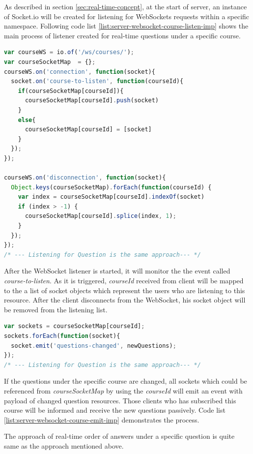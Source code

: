 As described in section \ref{sec:real-time-concept}, at the start of server, an instance of Socket.io will be created for listening for WebSockets requests within a specific namespace. Following code list \ref{list:server-websocket-course-listen-imp} shows the main process of listener created for real-time questions under a specific course.

\begin{lstlisting}[language=JavaScript, caption=Server starts listening for requests over WebSocket protocol , label={list:server-websocket-course-listen-imp}]
var courseWS = io.of('/ws/courses/');
var courseSocketMap  = {};
courseWS.on('connection', function(socket){
  socket.on('course-to-listen', function(courseId){
    if(courseSocketMap[courseId]){
      courseSocketMap[courseId].push(socket)
    }
    else{
      courseSocketMap[courseId] = [socket]
    }
  });
});

courseWS.on('disconnection', function(socket){
  Object.keys(courseSocketMap).forEach(function(courseId) {
    var index = courseSocketMap[courseId].indexOf(socket)
    if (index > -1) {
      courseSocketMap[courseId].splice(index, 1);
    }
  });
});
/* --- Listening for Question is the same approach--- */
\end{lstlisting}

After the WebSocket listener is started, it will monitor the the event called \textit{course-to-listen}. As it is triggered, \textit{courseId} received from client will be mapped to the a list of socket objects which represent the users who are listening to this resource. After the client disconnects from the WebSocket, his socket object will be removed from the listening list. 

\begin{lstlisting}[language=JavaScript, caption=Server broadcast to all sockets who has subscribed the certain resource, label={list:server-websocket-course-emit-imp}]
var sockets = courseSocketMap[courseId];
sockets.forEach(function(socket){
  socket.emit('questions-changed', newQuestions);
});
/* --- Listening for Question is the same approach--- */
\end{lstlisting}

If the questions under the specific course are changed, all sockets which could be referenced from \textit{courseSocketMap} by using the \textit{courseId} will emit an event with payload of changed question resources. Those clients who has subscribed this course will be informed and receive the new questions passively. Code list \ref{list:server-websocket-course-emit-imp} demonstrates the process.

The approach of real-time order of answers under a specific question is quite same as the approach mentioned above.